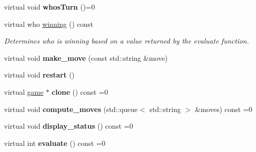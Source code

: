 \begin{DoxyCompactItemize}
\item 
virtual void {\bfseries whos\+Turn} ()=0\hypertarget{classmain__savitch__14_1_1game_a98190a2bf784ce0f20533475754d136d}{}\label{classmain__savitch__14_1_1game_a98190a2bf784ce0f20533475754d136d}

\item 
virtual who \hyperlink{classmain__savitch__14_1_1game_a081611c42aa66b4d91bbefeec47c7c4e}{winning} () const \hypertarget{classmain__savitch__14_1_1game_a081611c42aa66b4d91bbefeec47c7c4e}{}\label{classmain__savitch__14_1_1game_a081611c42aa66b4d91bbefeec47c7c4e}

\begin{DoxyCompactList}\small\item\em Determines who is winning based on a value returned by the evaluate function. \end{DoxyCompactList}\item 
virtual void {\bfseries make\+\_\+move} (const std\+::string \&move)\hypertarget{classmain__savitch__14_1_1game_a20597d0caa907aea47b27fed8be3759b}{}\label{classmain__savitch__14_1_1game_a20597d0caa907aea47b27fed8be3759b}

\item 
virtual void {\bfseries restart} ()\hypertarget{classmain__savitch__14_1_1game_ad521a7d78e7c163a0bc28b709f0d45fd}{}\label{classmain__savitch__14_1_1game_ad521a7d78e7c163a0bc28b709f0d45fd}

\item 
virtual \hyperlink{classmain__savitch__14_1_1game}{game} $\ast$ {\bfseries clone} () const =0\hypertarget{classmain__savitch__14_1_1game_a7b663057f59210dd52738facfc40d959}{}\label{classmain__savitch__14_1_1game_a7b663057f59210dd52738facfc40d959}

\item 
virtual void {\bfseries compute\+\_\+moves} (std\+::queue$<$ std\+::string $>$ \&moves) const =0\hypertarget{classmain__savitch__14_1_1game_a2c0c049f5861026d0f639b5837889b7a}{}\label{classmain__savitch__14_1_1game_a2c0c049f5861026d0f639b5837889b7a}

\item 
virtual void {\bfseries display\+\_\+status} () const =0\hypertarget{classmain__savitch__14_1_1game_ac8205178922c49bab2865187e834b726}{}\label{classmain__savitch__14_1_1game_ac8205178922c49bab2865187e834b726}

\item 
virtual int {\bfseries evaluate} () const =0\hypertarget{classmain__savitch__14_1_1game_a9b9c8c5e9aa57c9a430f20b87cb047aa}{}\label{classmain__savitch__14_1_1game_a9b9c8c5e9aa57c9a430f20b87cb047aa}


\end{DoxyCompactItemize}
